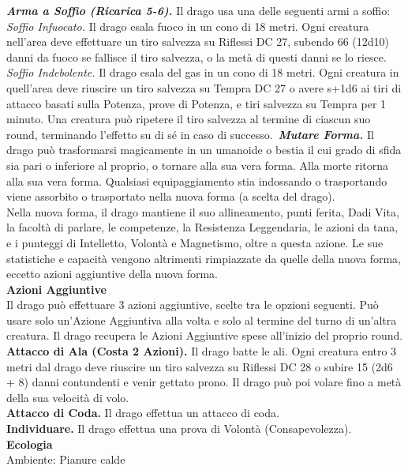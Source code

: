 \begin{multicols}{2}
\emph{\textbf{Arma a Soffio (Ricarica 5-6).}} Il drago usa una delle seguenti armi a soffio:\\
\emph{Soffio Infuocato.} Il drago esala fuoco in un cono di 18 metri. Ogni creatura nell'area deve effettuare un tiro salvezza su Riflessi DC  27, subendo 66 (12d10) danni da fuoco se fallisce il tiro salvezza, o la metà di questi danni se lo riesce.\\
\emph{Soffio Indebolente.} Il drago esala del gas in un cono di 18 metri. Ogni creatura in quell'area deve riuscire un tiro salvezza su Tempra DC  27 o avere s+1d6 ai tiri di attacco basati sulla Potenza, prove di Potenza, e tiri salvezza su Tempra per 1 minuto. Una creatura può ripetere il tiro salvezza al termine di ciascun suo round, terminando l'effetto su di sé in caso di successo.\
\emph{\textbf{Mutare Forma.}} Il drago può trasformarsi magicamente in un umanoide o bestia il cui grado di sfida sia pari o inferiore al proprio, o tornare alla sua vera forma. Alla morte ritorna alla sua vera forma. Qualsiasi equipaggiamento stia indossando o trasportando viene assorbito o trasportato nella nuova forma (a scelta del drago).\\
Nella nuova forma, il drago mantiene il suo allineamento, punti ferita, Dadi Vita, la facoltà di parlare, le competenze, la Resistenza Leggendaria, le azioni da tana, e i punteggi di Intelletto, Volontà e Magnetismo, oltre a questa azione. Le sue statistiche e capacità  vengono altrimenti rimpiazzate da quelle della nuova forma, eccetto azioni aggiuntive della nuova forma.\\
\textbf{Azioni Aggiuntive}\\
Il drago può effettuare 3 azioni aggiuntive, scelte tra le opzioni seguenti. Può usare solo un'Azione Aggiuntiva alla volta e solo al termine del turno di un'altra creatura. Il drago recupera le Azioni Aggiuntive spese all'inizio del proprio round.\\
\textbf{Attacco di Ala (Costa 2 Azioni).} Il drago batte le ali. Ogni creatura entro 3 metri dal drago deve riuscire un tiro salvezza su Riflessi DC  28 o subire 15 (2d6 + 8) danni contundenti e venir gettato prono. Il drago può poi volare fino a metà della sua velocità di volo.\\
\textbf{Attacco di Coda.} Il drago effettua un attacco di coda.\\
\textbf{Individuare.} Il drago effettua una prova di Volontà (Consapevolezza).\\
\textbf{Ecologia}\\
Ambiente: Pianure calde\\

\end{multicols}
